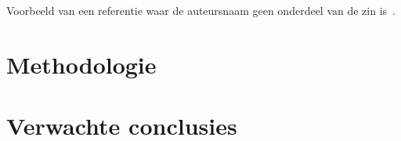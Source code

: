 \documentclass{hogent-article}
\begin{document}
    
    Voorbeeld van een referentie waar de auteursnaam geen onderdeel van de zin is~\autocite{Moore2002}.
    
    \lipsum[4-9]
    
    \section{Methodologie}
    
    
    \lipsum[10-12]
    
    \section{Verwachte conclusies}
    
    
    \lipsum[14-18]
    
    
    \printbibliography[heading=bibintoc]
    
\end{document}
